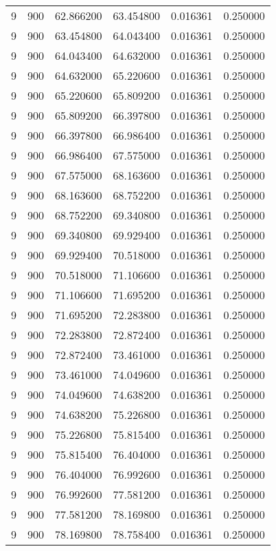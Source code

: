 \begin{longtable}{rrrrrr}
9 & 900 & 62.866200 & 63.454800 & 0.016361 & 0.250000 \\
9 & 900 & 63.454800 & 64.043400 & 0.016361 & 0.250000 \\
9 & 900 & 64.043400 & 64.632000 & 0.016361 & 0.250000 \\
9 & 900 & 64.632000 & 65.220600 & 0.016361 & 0.250000 \\
9 & 900 & 65.220600 & 65.809200 & 0.016361 & 0.250000 \\
9 & 900 & 65.809200 & 66.397800 & 0.016361 & 0.250000 \\
9 & 900 & 66.397800 & 66.986400 & 0.016361 & 0.250000 \\
9 & 900 & 66.986400 & 67.575000 & 0.016361 & 0.250000 \\
9 & 900 & 67.575000 & 68.163600 & 0.016361 & 0.250000 \\
9 & 900 & 68.163600 & 68.752200 & 0.016361 & 0.250000 \\
9 & 900 & 68.752200 & 69.340800 & 0.016361 & 0.250000 \\
9 & 900 & 69.340800 & 69.929400 & 0.016361 & 0.250000 \\
9 & 900 & 69.929400 & 70.518000 & 0.016361 & 0.250000 \\
9 & 900 & 70.518000 & 71.106600 & 0.016361 & 0.250000 \\
9 & 900 & 71.106600 & 71.695200 & 0.016361 & 0.250000 \\
9 & 900 & 71.695200 & 72.283800 & 0.016361 & 0.250000 \\
9 & 900 & 72.283800 & 72.872400 & 0.016361 & 0.250000 \\
9 & 900 & 72.872400 & 73.461000 & 0.016361 & 0.250000 \\
9 & 900 & 73.461000 & 74.049600 & 0.016361 & 0.250000 \\
9 & 900 & 74.049600 & 74.638200 & 0.016361 & 0.250000 \\
9 & 900 & 74.638200 & 75.226800 & 0.016361 & 0.250000 \\
9 & 900 & 75.226800 & 75.815400 & 0.016361 & 0.250000 \\
9 & 900 & 75.815400 & 76.404000 & 0.016361 & 0.250000 \\
9 & 900 & 76.404000 & 76.992600 & 0.016361 & 0.250000 \\
9 & 900 & 76.992600 & 77.581200 & 0.016361 & 0.250000 \\
9 & 900 & 77.581200 & 78.169800 & 0.016361 & 0.250000 \\
9 & 900 & 78.169800 & 78.758400 & 0.016361 & 0.250000 \\

\end{longtable}
